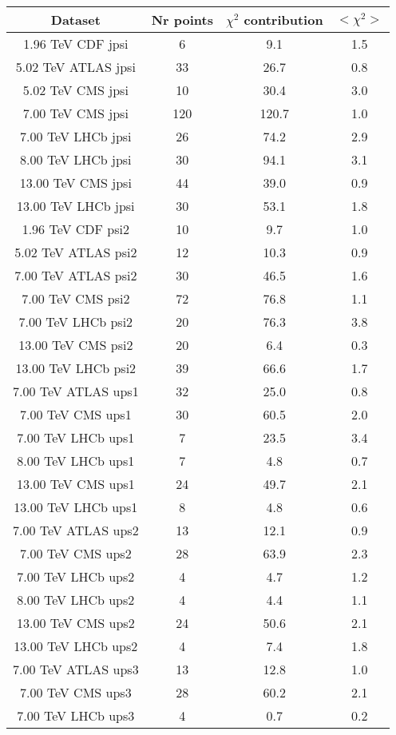 \begin{table}[h!]
\centering
\begin{tabular}{c|c|c|c}
Dataset & Nr points & $\chi^2$ contribution & $<\chi^2>$ \\
\hline
1.96 TeV CDF jpsi & 6 & 9.1 & 1.5 \\
5.02 TeV ATLAS jpsi & 33 & 26.7 & 0.8 \\
5.02 TeV CMS jpsi & 10 & 30.4 & 3.0 \\
7.00 TeV CMS jpsi & 120 & 120.7 & 1.0 \\
7.00 TeV LHCb jpsi & 26 & 74.2 & 2.9 \\
8.00 TeV LHCb jpsi & 30 & 94.1 & 3.1 \\
13.00 TeV CMS jpsi & 44 & 39.0 & 0.9 \\
13.00 TeV LHCb jpsi & 30 & 53.1 & 1.8 \\
1.96 TeV CDF psi2 & 10 & 9.7 & 1.0 \\
5.02 TeV ATLAS psi2 & 12 & 10.3 & 0.9 \\
7.00 TeV ATLAS psi2 & 30 & 46.5 & 1.6 \\
7.00 TeV CMS psi2 & 72 & 76.8 & 1.1 \\
7.00 TeV LHCb psi2 & 20 & 76.3 & 3.8 \\
13.00 TeV CMS psi2 & 20 & 6.4 & 0.3 \\
13.00 TeV LHCb psi2 & 39 & 66.6 & 1.7 \\
7.00 TeV ATLAS ups1 & 32 & 25.0 & 0.8 \\
7.00 TeV CMS ups1 & 30 & 60.5 & 2.0 \\
7.00 TeV LHCb ups1 & 7 & 23.5 & 3.4 \\
8.00 TeV LHCb ups1 & 7 & 4.8 & 0.7 \\
13.00 TeV CMS ups1 & 24 & 49.7 & 2.1 \\
13.00 TeV LHCb ups1 & 8 & 4.8 & 0.6 \\
7.00 TeV ATLAS ups2 & 13 & 12.1 & 0.9 \\
7.00 TeV CMS ups2 & 28 & 63.9 & 2.3 \\
7.00 TeV LHCb ups2 & 4 & 4.7 & 1.2 \\
8.00 TeV LHCb ups2 & 4 & 4.4 & 1.1 \\
13.00 TeV CMS ups2 & 24 & 50.6 & 2.1 \\
13.00 TeV LHCb ups2 & 4 & 7.4 & 1.8 \\
7.00 TeV ATLAS ups3 & 13 & 12.8 & 1.0 \\
7.00 TeV CMS ups3 & 28 & 60.2 & 2.1 \\
7.00 TeV LHCb ups3 & 4 & 0.7 & 0.2 \\

\end{tabular}
\end{table}
